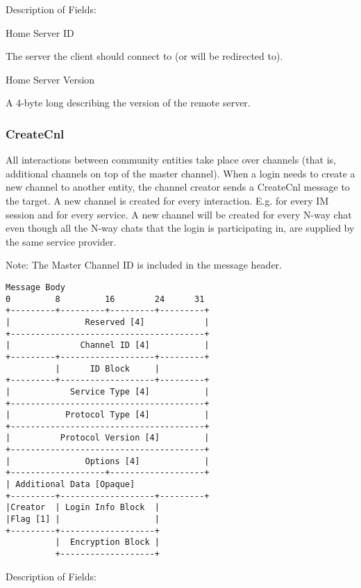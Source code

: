 \documentclass[titlepage,oneside]{book}
\begin{document}
\par{} Description of Fields:

\par{} Home Server ID

\subpar{}   The server the client should connect to (or will be redirected to).

\par{} Home Server Version

\subpar{}  A 4-byte long describing the version of the remote server.

\subsubsection{CreateCnl}

\par{} All interactions between community entities take place over channels
(that is, additional channels on top of the master channel). When a
login needs to create a new channel to another entity, the channel
creator sends a CreateCnl message to the target. A new channel is
created for every interaction. E.g. for every IM session and for every
service. A new channel will be created for every N-way chat even though
all the N-way chats that the login is participating in, are supplied by
the same service provider.

\par{} Note: The Master Channel ID is included in the message header.

\begin{verbatim}
Message Body
0         8         16        24      31
+---------+---------+---------+---------+
|               Reserved [4]            |
+---------------------------------------+
|              Channel ID [4]           |
+---------+-------------------+---------+
          |      ID Block     |
+---------+-------------------+---------+
|            Service Type [4]           |
+---------------------------------------+
|           Protocol Type [4]           |
+---------------------------------------+
|          Protocol Version [4]         |
+---------------------------------------+
|               Options [4]             |
+-------------------+-------------------+
| Additional Data [Opaque]
+---------+-------------------+---------+
|Creator  | Login Info Block  |
|Flag [1] |                   |
+---------+-------------------+
          |  Encryption Block |
          +-------------------+
\end{verbatim}

\par{} Description of Fields:
\end{document}
